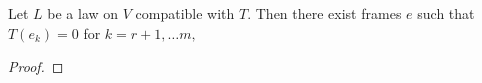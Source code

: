 % 

\begin{theorem}[Pi Theorem]

Let $L$ be a law on $V$ compatible with $T$. Then there exist frames $e$ such that $T(e_{k}) = 0$ for $k=r+1,\dots m,$

\label{thm:pi}
\end{theorem}

\begin{proof}

\end{proof}


\endinput %